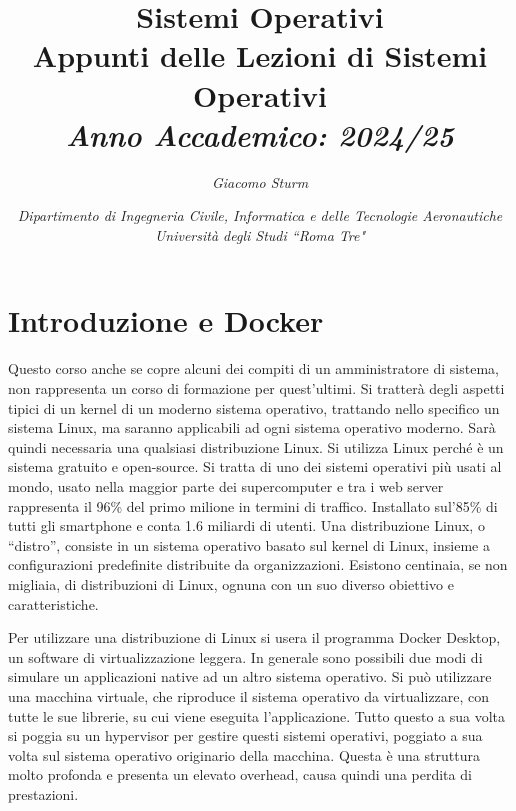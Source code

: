 \documentclass{article}
\numberwithin{equation}{subsection}
\begin{document}
\title{%
    \textbf{Sistemi Operativi}  \\ 
    \large Appunti delle Lezioni di Sistemi Operativi \\
    \textit{Anno Accademico: 2024/25}}
\author{\textit{Giacomo Sturm}}
\date{\textit{Dipartimento di Ingegneria Civile, Informatica e delle Tecnologie Aeronautiche \\
Università degli Studi ``Roma Tre"}}

\maketitle
\thispagestyle{link}

\clearpage


\pagestyle{fancy}
\fancyhead{}\fancyfoot{}
\fancyfoot[C]{\thepage}

\tableofcontents

\clearpage
{}


\section{Introduzione e Docker} 

Questo corso anche se copre alcuni dei compiti di un amministratore di sistema, non rappresenta un corso di formazione per quest'ultimi. Si tratterà degli aspetti tipici di un kernel di un 
moderno sistema operativo, trattando nello specifico un sistema Linux, ma saranno applicabili ad ogni sistema operativo moderno. Sarà quindi necessaria una qualsiasi distribuzione Linux. Si utilizza Linux perché 
è un sistema gratuito e open-source. Si tratta di uno dei sistemi operativi più usati al mondo, usato nella maggior parte dei supercomputer e tra i web server rappresenta il 96\% del primo milione in termini di 
traffico. Installato sul'85\% di tutti gli smartphone e conta 1.6 miliardi di utenti. 
Una distribuzione Linux, o ``distro'', consiste in un sistema operativo basato sul kernel di Linux, insieme a configurazioni predefinite distribuite da organizzazioni. Esistono centinaia, se non migliaia, 
di distribuzioni di Linux, ognuna con un suo diverso obiettivo e caratteristiche. 

Per utilizzare una distribuzione di Linux si usera il programma Docker Desktop, un software di virtualizzazione leggera. In generale sono possibili due modi di simulare un applicazioni native ad un altro sistema 
operativo. Si può utilizzare una macchina virtuale, che riproduce il sistema operativo da virtualizzare, con tutte le sue librerie, su cui viene eseguita l'applicazione. Tutto questo a sua volta si poggia su un 
hypervisor per gestire questi sistemi operativi, poggiato a sua volta sul sistema operativo originario della macchina. Questa è una struttura molto profonda e presenta un elevato overhead, causa quindi una perdita 
di prestazioni. 
\end{document}
